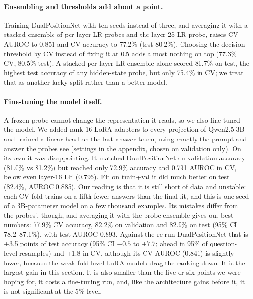\documentclass[11pt]{article}
\begin{document}
\paragraph{Ensembling and thresholds add about a point.} Training DualPositionNet with ten seeds instead of three, and averaging it with a stacked ensemble of per-layer LR probes and the layer-25 LR probe, raises CV AUROC to 0.851 and CV accuracy to 77.2\% (test 80.2\%). Choosing the decision threshold by CV instead of fixing it at 0.5 adds almost nothing on top (77.3\% CV, 80.5\% test). A stacked per-layer LR ensemble alone scored 81.7\% on test, the highest test accuracy of any hidden-state probe, but only 75.4\% in CV; we treat that as another lucky split rather than a better model.

\paragraph{Fine-tuning the model itself.} A frozen probe cannot change the representation it reads, so we also fine-tuned the model. We added rank-16 LoRA adapters to every projection of Qwen2.5-3B and trained a linear head on the last answer token, using exactly the prompt and answer the probes see (settings in the appendix, chosen on validation only). On its own it was disappointing. It matched DualPositionNet on validation accuracy (81.0\% vs 81.2\%) but reached only 72.9\% accuracy and 0.791 AUROC in CV, below even layer-16 LR (0.796). Fit on train+val it did much better on test (82.4\%, AUROC 0.885). Our reading is that it is still short of data and unstable: each CV fold trains on a fifth fewer answers than the final fit, and this is one seed of a 3B-parameter model on a few thousand examples. Its mistakes differ from the probes', though, and averaging it with the probe ensemble gives our best numbers: 77.9\% CV accuracy, 82.2\% on validation and 82.9\% on test (95\% CI 78.2--87.1\%), with test AUROC 0.893. Against the re-run DualPositionNet that is +3.5 points of test accuracy (95\% CI $-0.5$ to $+7.7$; ahead in 95\% of question-level resamples) and +1.8 in CV, although its CV AUROC (0.841) is slightly lower, because the weak fold-level LoRA models drag the ranking down. It is the largest gain in this section. It is also smaller than the five or six points we were hoping for, it costs a fine-tuning run, and, like the architecture gains before it, it is not significant at the 5\% level.
\end{document}

